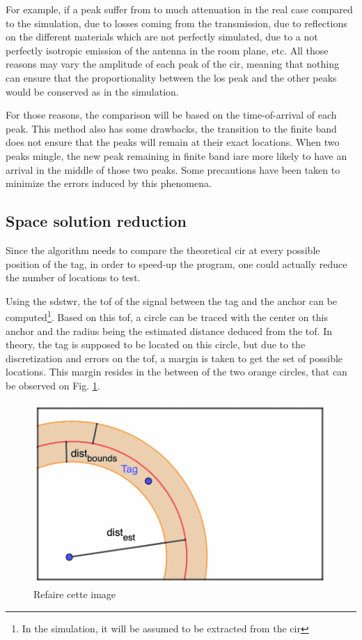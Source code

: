 For example, if a peak suffer from to much attenuation in the real case compared to the simulation, due to losses coming from the transmission, due to reflections on the different materials which are not perfectly simulated, due to a not perfectly isotropic emission of the antenna in the room plane, etc. All those reasons may vary the amplitude of each peak of the \gls{cir}, meaning that nothing can ensure that the proportionality between the \gls{los} peak and the other peaks would be conserved as in the simulation.
\vspace{2mm}

For those reasons, the comparison will be based on the time-of-arrival of each peak. This method also has some drawbacks, the transition to the finite band does not ensure that the peaks will remain at their exact locations. When two peaks mingle, the new peak remaining in finite band iare more likely to have an arrival in the middle of those two peaks. Some precautions have been taken to minimize the errors induced by this phenomena.
\vspace{2mm}

\subsection{Space solution reduction}

Since the algorithm needs to compare the theoretical \gls{cir} at every possible position of the tag, in order to speed-up the program, one could actually reduce the number of locations to test.
\vspace{2mm}

Using the \gls{sdstwr}, the \gls{tof} of the signal between the tag and the anchor can be computed\footnote{In the simulation, it will be assumed to be extracted from the \gls{cir}}. Based on this \gls{tof}, a circle can be traced with the center on this anchor and the radius being the estimated distance deduced from the \gls{tof}. In theory, the tag is supposed to be located on this circle, but due to the discretization and errors on the \gls{tof}, a margin is taken to get the set of possible locations. This margin resides in the between of the two orange circles, that can be observed on Fig. \ref{fig:speedup_1}.
\vspace{2mm}

\begin{figure}[H]
\centering
\includegraphics[width=.65\linewidth]{Images/algo_1.png}
\caption{\color{red} Refaire cette image \color{black}}
\label{fig:speedup_1}
\end{figure}

